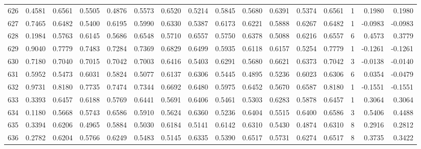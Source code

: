 \begin{tabular}{lrrrrrrrrrrrrrrr}
626 &      0.4581 &  0.6561 &  0.5505 &  0.4876 &  0.5573 &  0.6520 &  0.5214 &  0.5845 &  0.5680 &  0.6391 &   0.5374 &     0.6561 &      1 &                    0.1980 &                     0.1980 \\
627 &      0.7465 &  0.6482 &  0.5400 &  0.6195 &  0.5990 &  0.6330 &  0.5387 &  0.6173 &  0.6221 &  0.5888 &   0.6267 &     0.6482 &      1 &                   -0.0983 &                    -0.0983 \\
628 &      0.1984 &  0.5763 &  0.6145 &  0.5686 &  0.6548 &  0.5710 &  0.6557 &  0.5750 &  0.6378 &  0.5088 &   0.6216 &     0.6557 &      6 &                    0.4573 &                     0.3779 \\
629 &      0.9040 &  0.7779 &  0.7483 &  0.7284 &  0.7369 &  0.6829 &  0.6499 &  0.5935 &  0.6118 &  0.6157 &   0.5254 &     0.7779 &      1 &                   -0.1261 &                    -0.1261 \\
630 &      0.7180 &  0.7040 &  0.7015 &  0.7042 &  0.7003 &  0.6416 &  0.5403 &  0.6291 &  0.5680 &  0.6621 &   0.6373 &     0.7042 &      3 &                   -0.0138 &                    -0.0140 \\
631 &      0.5952 &  0.5473 &  0.6031 &  0.5824 &  0.5077 &  0.6137 &  0.6306 &  0.5445 &  0.4895 &  0.5236 &   0.6023 &     0.6306 &      6 &                    0.0354 &                    -0.0479 \\
632 &      0.9731 &  0.8180 &  0.7735 &  0.7474 &  0.7344 &  0.6692 &  0.6480 &  0.5975 &  0.6452 &  0.5670 &   0.6587 &     0.8180 &      1 &                   -0.1551 &                    -0.1551 \\
633 &      0.3393 &  0.6457 &  0.6188 &  0.5769 &  0.6441 &  0.5691 &  0.6406 &  0.5461 &  0.5303 &  0.6283 &   0.5878 &     0.6457 &      1 &                    0.3064 &                     0.3064 \\
634 &      0.1180 &  0.5668 &  0.5743 &  0.6586 &  0.5910 &  0.5624 &  0.6360 &  0.5236 &  0.6404 &  0.5515 &   0.6400 &     0.6586 &      3 &                    0.5406 &                     0.4488 \\
635 &      0.3394 &  0.6206 &  0.4965 &  0.5884 &  0.5030 &  0.6184 &  0.5141 &  0.6142 &  0.6310 &  0.5430 &   0.4874 &     0.6310 &      8 &                    0.2916 &                     0.2812 \\
636 &      0.2782 &  0.6204 &  0.5766 &  0.6249 &  0.5483 &  0.5145 &  0.6335 &  0.5390 &  0.6517 &  0.5731 &   0.6274 &     0.6517 &      8 &                    0.3735 &                     0.3422 \\

\end{tabular}
